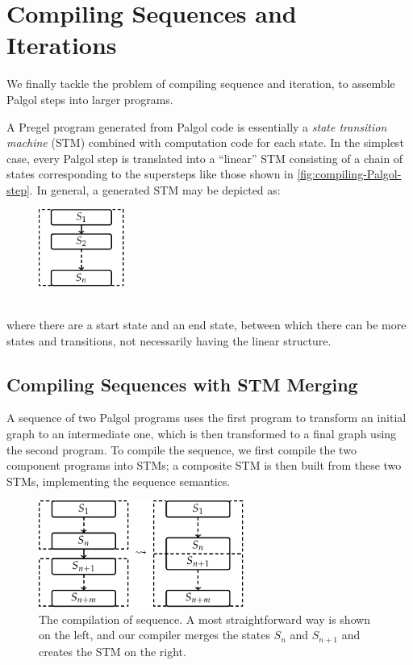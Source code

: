 \documentclass{sokendai_thesis} %
\begin{document}
\section{Compiling Sequences and Iterations}
\label{sec:trans-iter}

We finally tackle the problem of compiling sequence and iteration, to assemble Palgol steps into larger programs.

A Pregel program generated from Palgol code is essentially a \emph{state transition machine} (STM) combined with computation code for each state.
In the simplest case, every Palgol step is translated into a ``linear'' STM consisting of a chain of states corresponding to the supersteps like those shown in \autoref{fig:compiling-Palgol-step}.
In general, a generated STM may be depicted as:
\begin{figure}[h]
 \centering
 \includegraphics[width=0.25\textwidth]{figures/stm-general.pdf}
\end{figure}\\
where there are a start state and an end state, between which there can be more states and transitions, not necessarily having the linear structure.

\subsection{Compiling Sequences with STM Merging}

A sequence of two Palgol programs uses the first program to transform an initial graph to an intermediate one, which is then transformed to a final graph using the second program.
To compile the sequence, we first compile the two component programs into STMs; a composite STM is then built from these two STMs, implementing the sequence semantics.

\begin{figure}[t]
 \centering
 \includegraphics[width=0.6\textwidth]{figures/stm-seq.pdf}
 \caption{The compilation of sequence. A most straightforward way is shown on the left, and our compiler merges the states $S_n$ and $S_{n+1}$ and creates the STM on the right.}
 \label{fig:sequence}
\vspace{-2ex}\end{figure}
\end{document}
